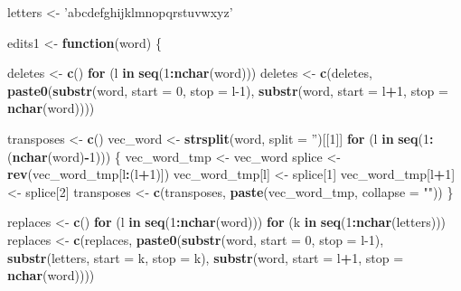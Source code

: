 \documentclass[]{article}
\newenvironment{Shaded}{\begin{snugshade}}{\end{snugshade}}
\newcommand{\ControlFlowTok}[1]{\textcolor[rgb]{0.13,0.29,0.53}{\textbf{#1}}}
\newcommand{\DataTypeTok}[1]{\textcolor[rgb]{0.13,0.29,0.53}{#1}}
\newcommand{\DecValTok}[1]{\textcolor[rgb]{0.00,0.00,0.81}{#1}}
\newcommand{\KeywordTok}[1]{\textcolor[rgb]{0.13,0.29,0.53}{\textbf{#1}}}
\newcommand{\NormalTok}[1]{#1}
\newcommand{\OperatorTok}[1]{\textcolor[rgb]{0.81,0.36,0.00}{\textbf{#1}}}
\newcommand{\StringTok}[1]{\textcolor[rgb]{0.31,0.60,0.02}{#1}}
\begin{document}
\begin{Shaded}
\begin{Highlighting}[]
\NormalTok{letters <-}\StringTok{ 'abcdefghijklmnopqrstuvwxyz'}

\NormalTok{edits1 <-}\StringTok{ }\ControlFlowTok{function}\NormalTok{(word) \{}
  
\NormalTok{  deletes <-}\StringTok{ }\KeywordTok{c}\NormalTok{()}
  \ControlFlowTok{for}\NormalTok{ (l }\ControlFlowTok{in} \KeywordTok{seq}\NormalTok{(}\DecValTok{1}\OperatorTok{:}\KeywordTok{nchar}\NormalTok{(word)))}
\NormalTok{    deletes <-}\StringTok{ }\KeywordTok{c}\NormalTok{(deletes, }\KeywordTok{paste0}\NormalTok{(}\KeywordTok{substr}\NormalTok{(word, }\DataTypeTok{start =} \DecValTok{0}\NormalTok{, }\DataTypeTok{stop =}\NormalTok{ l}\DecValTok{-1}\NormalTok{), }\KeywordTok{substr}\NormalTok{(word, }\DataTypeTok{start =}\NormalTok{ l}\OperatorTok{+}\DecValTok{1}\NormalTok{, }\DataTypeTok{stop =} \KeywordTok{nchar}\NormalTok{(word))))}
  
\NormalTok{  transposes <-}\StringTok{ }\KeywordTok{c}\NormalTok{()}
\NormalTok{  vec_word <-}\StringTok{ }\KeywordTok{strsplit}\NormalTok{(word, }\DataTypeTok{split =} \StringTok{''}\NormalTok{)[[}\DecValTok{1}\NormalTok{]]}
  \ControlFlowTok{for}\NormalTok{ (l }\ControlFlowTok{in} \KeywordTok{seq}\NormalTok{(}\DecValTok{1}\OperatorTok{:}\NormalTok{(}\KeywordTok{nchar}\NormalTok{(word)}\OperatorTok{-}\DecValTok{1}\NormalTok{))) \{}
\NormalTok{    vec_word_tmp <-}\StringTok{ }\NormalTok{vec_word}
\NormalTok{    splice <-}\StringTok{ }\KeywordTok{rev}\NormalTok{(vec_word_tmp[l}\OperatorTok{:}\NormalTok{(l}\OperatorTok{+}\DecValTok{1}\NormalTok{)])}
\NormalTok{    vec_word_tmp[l] <-}\StringTok{ }\NormalTok{splice[}\DecValTok{1}\NormalTok{]}
\NormalTok{    vec_word_tmp[l}\OperatorTok{+}\DecValTok{1}\NormalTok{] <-}\StringTok{ }\NormalTok{splice[}\DecValTok{2}\NormalTok{]}
\NormalTok{    transposes <-}\StringTok{ }\KeywordTok{c}\NormalTok{(transposes, }\KeywordTok{paste}\NormalTok{(vec_word_tmp, }\DataTypeTok{collapse =} \StringTok{""}\NormalTok{))}
\NormalTok{  \}}
  
\NormalTok{  replaces <-}\StringTok{ }\KeywordTok{c}\NormalTok{()}
  \ControlFlowTok{for}\NormalTok{ (l }\ControlFlowTok{in} \KeywordTok{seq}\NormalTok{(}\DecValTok{1}\OperatorTok{:}\KeywordTok{nchar}\NormalTok{(word)))}
    \ControlFlowTok{for}\NormalTok{ (k }\ControlFlowTok{in} \KeywordTok{seq}\NormalTok{(}\DecValTok{1}\OperatorTok{:}\KeywordTok{nchar}\NormalTok{(letters)))}
\NormalTok{      replaces <-}\StringTok{ }\KeywordTok{c}\NormalTok{(replaces, }\KeywordTok{paste0}\NormalTok{(}\KeywordTok{substr}\NormalTok{(word, }\DataTypeTok{start =} \DecValTok{0}\NormalTok{, }\DataTypeTok{stop =}\NormalTok{ l}\DecValTok{-1}\NormalTok{), }\KeywordTok{substr}\NormalTok{(letters, }\DataTypeTok{start =}\NormalTok{ k, }\DataTypeTok{stop =}\NormalTok{ k), }\KeywordTok{substr}\NormalTok{(word, }\DataTypeTok{start =}\NormalTok{ l}\OperatorTok{+}\DecValTok{1}\NormalTok{, }\DataTypeTok{stop =} \KeywordTok{nchar}\NormalTok{(word))))}
  

\end{Highlighting}
\end{Shaded}
\end{document}
